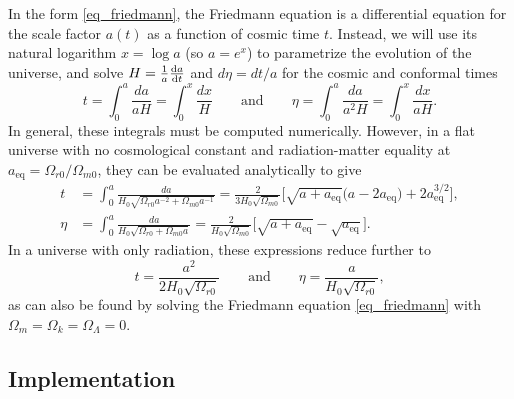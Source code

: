 \documentclass[10pt,a4paper]{article}
\begin{document}
In the form \eqref{eq_friedmann},
the Friedmann equation is a differential equation for the scale factor $a(t)$
as a function of cosmic time $t$.
Instead, we will use its natural logarithm $x = \log a$ (so $a = e^x$) to parametrize the evolution of the universe,
and solve $H = \frac1a \odv{a}{t}$ and $d\eta = dt / a$ for the cosmic and conformal times
\begin{equation}
	t = \int_0^a \frac{da}{aH} = \int_0^x \frac{dx}{H}
	\qquad \text{and} \qquad
	\eta = \int_0^a \frac{da}{a^2 H} = \int_0^x \frac{dx}{aH}.
\label{eq_cosmic_conformal_time}
\end{equation}
In general, these integrals must be computed numerically.
However, in a flat universe with no cosmological constant and radiation-matter equality at $a_\text{eq} = \Omega_{r0}/\Omega_{m0}$,
they can be evaluated analytically to give
\begin{subequations}
\begin{align}
	t &= \int_0^a \frac{da}{H_0 \sqrt{\Omega_{r0}a^{-2} + \Omega_{m0}a^{-1}}}
	   = \frac{2}{3 H_0 \sqrt{\Omega_{m0}}} \Big[\sqrt{a + a_\text{eq}} \big(a - 2 a_\text{eq}\big) + 2 a_\text{eq}^{3/2} \Big]
	\label{eq_cosmic_time_anal}, \\
	\eta &= \int_0^a \frac{da}{H_0 \sqrt{\Omega_{r0} + \Omega_{m0} a}}
		 = \frac{2}{H_0 \sqrt{\Omega_{m0}}} \Big[ \sqrt{a + a_\text{eq}} - \sqrt{a_\text{eq}}\Big]
	\label{eq_conformal_time_anal}.
\end{align}
\label{eq_cosmic_conformal_time_anal}
\end{subequations}
In a universe with only radiation, these expressions reduce further to
\begin{equation}
	t = \frac{a^2}{2 H_0 \sqrt{\Omega_{r0}}}
	\qquad \text{and} \qquad
	\eta = \frac{a}{H_0 \sqrt{\Omega_{r0}}},
\label{eq_cosmic_conformal_time_anal_radiation}
\end{equation}
as can also be found by solving the Friedmann equation \eqref{eq_friedmann} with $\Omega_{m} = \Omega_{k} = \Omega_{\Lambda} = 0$.


\subsection{Implementation}
\label{sec_background_cosmology_implementation}
\end{document}
